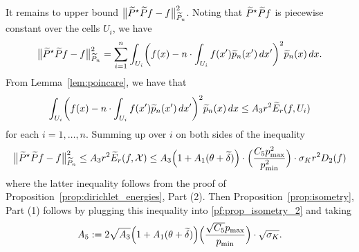 It remains to upper bound $\bigl\|\widetilde{P}^{\star}\widetilde{P}f - f\bigr\|_{\widetilde{P}_n}^2$. Noting that $\widetilde{P}^{\star}\widetilde{P}f$ is piecewise constant over the cells $U_i$, we have
\begin{equation*}
\bigl\|\widetilde{P}^{\star}\widetilde{P}f - f\bigr\|_{\widetilde{P}_n}^2 = \sum_{i = 1}^{n} \int_{U_i} \biggl(f(x) - n\cdot\int_{U_i} f(x') \widetilde{p}_n(x') \,dx'\biggr)^2 \widetilde{p}_n(x) \,dx.
\end{equation*}
From Lemma~\ref{lem:poincare}, we have that
\begin{equation*}
\int_{U_i} \biggl(f(x) - n\cdot\int_{U_i} f(x') \widetilde{p}_n(x') \,dx'\biggr)^2 \widetilde{p}_n(x) \,dx \leq A_3r^2 \widetilde{E}_r(f,U_i)
\end{equation*}
for each $i = 1,\ldots,n$. Summing up over $i$ on both sides of the inequality
\begin{equation*}
\bigl\|\widetilde{P}^{\star}\widetilde{P}f - f\bigr\|_{\widetilde{P}_n}^2 \leq A_3r^2 \widetilde{E}_r(f,\mathcal{X}) \leq  A_3 \Bigl(1 + A_1(\theta + \widetilde{\delta})\Bigr) \cdot \Bigl(\frac{C_5 p_{\max}^2}{p_{\min}^2}\Bigr) \cdot \sigma_{K}r^2 D_2(f) 
\end{equation*}
where the latter inequality follows from the proof of Proposition~\ref{prop:dirichlet_energies}, Part (2). Then Proposition~\ref{prop:isometry}, Part (1) follows by plugging this inequality into \eqref{pf:prop_isometry_2} and taking 
\begin{equation*}
A_5 := 2\sqrt{A_3} \Bigl(1 + A_1(\theta + \widetilde{\delta})\Bigr) \Bigl(\frac{\sqrt{C_5} p_{\max}}{p_{\min}}\Bigr) \cdot \sqrt{\sigma_{K}}.
\end{equation*}

